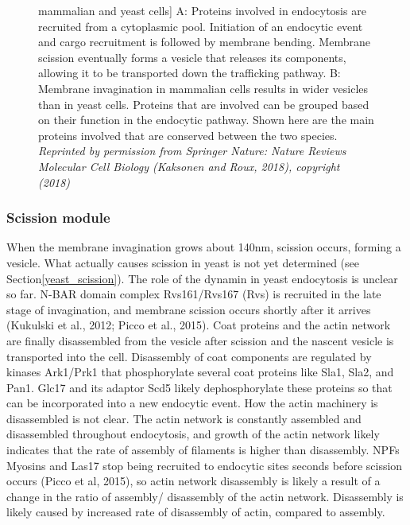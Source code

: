 \begin{figure}[H]
 mammalian and yeast cells]
	{A: Proteins involved in endocytosis are recruited from a cytoplasmic pool. Initiation of an endocytic event and cargo recruitment is followed by membrane bending. Membrane scission eventually forms a vesicle that releases its components, allowing it to be transported down the trafficking pathway. B: Membrane invagination in mammalian cells results in wider vesicles than in yeast cells. Proteins that are involved can be grouped based on their function in the endocytic pathway. Shown here are the main proteins involved that are conserved between the two species. 
		\textit{Reprinted by permission from Springer Nature: Nature Reviews Molecular Cell Biology (Kaksonen and Roux, 2018), copyright (2018)}
		\label{intro_endpathway}}
\end{figure}

\newpage
			\subsubsection{Scission module}
When the membrane invagination grows about 140nm, scission occurs, forming a vesicle. What actually causes scission in yeast is not yet determined (see Section\ref{yeast_scission}).
The role of the dynamin in yeast endocytosis is unclear so far. N-BAR domain complex Rvs161/Rvs167 (Rvs) is recruited in the late stage of invagination, and membrane scission occurs shortly after it arrives (Kukulski et al., 2012; Picco et al., 2015). 
\vspace{5mm}
Coat proteins and the actin network are finally disassembled from the vesicle after scission and the nascent vesicle is transported into the cell. Disassembly of coat components are regulated by kinases Ark1/Prk1 that phosphorylate several coat proteins like Sla1, Sla2, and Pan1. Glc17 and its adaptor Scd5 likely dephosphorylate these proteins so that can be incorporated into a new endocytic event. How the actin machinery is disassembled is not clear. The actin network is constantly assembled and disassembled throughout endocytosis, and growth of the actin network likely indicates that the rate of assembly of filaments is higher than disassembly. NPFs Myosins and Las17 stop being recruited to endocytic sites seconds before scission occurs (Picco et al, 2015), so actin network disassembly is likely a result of a change in the ratio of assembly/ disassembly of the actin network. Disassembly is likely caused by increased rate of disassembly of actin, compared to assembly. 




